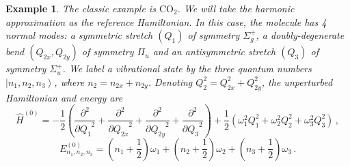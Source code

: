 \documentclass{article}
\theoremstyle{plain}\theoremheaderfont{\normalfont\itshape}\theorembodyfont{\rmfamily}\theoremseparator{.}\newtheorem*{rem}{Remark}\newtheorem*{ex}{Example}\newtheorem*{proof}{Proof}\newtheorem*{altp}{Alternative proof}
\theoremstyle{plain}\theoremheaderfont{\normalfont\bfseries}\theorembodyfont{\rmfamily}\theoremseparator{.}\newtheorem{thm}{Theorem}[section]\newtheorem{lem}[thm]{Lemma}\newtheorem{prop}[thm]{Proposition}\newtheorem*{cor}{Corollary}\newtheorem{defn}[thm]{Definition}\newtheorem{clm}[thm]{Claim}\newtheorem{clminproof}{Claim}
\theoremstyle{break}\theoremheaderfont{\normalfont\itshape}\theorembodyfont{\rmfamily}\theoremseparator{.\medskip}\newtheorem*{proofskip}{Proof}\newtheorem*{exs}{Examples}\newtheorem*{rems}{Remarks}
\theoremstyle{break}\theoremheaderfont{\normalfont\bfseries}\theorembodyfont{\rmfamily}\theoremseparator{.\medskip}\newtheorem{lemskip}[thm]{Lemma}\newtheorem{defnskip}[thm]{Definition}\newtheorem{propskip}[thm]{Proposition}\newtheorem{thmskip}[thm]{Theorem}
\numberwithin{equation}{section}
\newcommand{\pdv}[3][]{\frac{\partial^{#1} #2}{{\partial #3}^{#1}}}
\newcommand{\ket}[1]{\left| #1 \right\rangle}
\begin{document}
\begin{ex}
        The classic example is \(\mathrm{CO_2}\). We will take the harmonic approximation as the reference Hamiltonian. In this case, the molecule has 4 normal modes: a symmetric stretch \((Q_1)\) of symmetry \(\Sigma_g^+\), a doubly-degenerate bend \((Q_{2x},Q_{2y})\) of symmetry \(\Pi_u\) and an antisymmetric stretch \((Q_3)\) of symmetry \(\Sigma_u^+\). We label a vibrational state by the three quantum numbers \(\ket{n_1,n_2,n_3}\), where \(n_2=n_{2x}+n_{2y}\). Denoting \(Q_2^2=Q_{2x}^2+Q_{2y}^2\), the unperturbed Hamiltonian and energy are
        \begin{equation}
            \hat{H}^{(0)}=-\frac{1}{2}\left(\pdv[2]{}{Q_1}+\pdv[2]{}{Q_{2x}}+\pdv[2]{}{Q_{2y}}+\pdv[2]{}{Q_3}\right)+\frac{1}{2}(\omega_1^2Q_1^2+\omega_2^2Q_{2}^2+\omega_3^2Q_3^2)\,,
        \end{equation}
        \begin{equation}
            E_{n_1,n_2,n_3}^{(0)}=\left(n_1+\frac{1}{2}\right)\omega_1+\left(n_2+\frac{1}{2}\right)\omega_2+\left(n_3+\frac{1}{2}\right)\omega_3\,.
        \end{equation}

        \begin{figure}
            \centering
\end{figure}
\end{ex}
\end{document}
